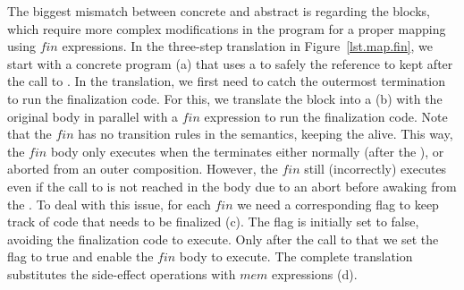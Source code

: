 The biggest mismatch between concrete and abstract \CEU is regarding the 
 blocks, which require more complex modifications in the program
for a proper mapping using $fin$ expressions.
In the three-step translation in Figure~\ref{lst.map.fin}, we start with a 
concrete program (a) that uses a  to safely  the 
reference to  kept after the call to .
In the translation, we first need to catch the outermost  
termination to run the finalization code.
For this, we translate the block into a  (b) with the original 
body in parallel with a $fin$ expression to run the finalization code.
Note that the $fin$ has no transition rules in the semantics, keeping the 
 alive.
This way, the $fin$ body only executes when the  terminates either 
normally (after the ), or aborted from an outer composition.
%
However, the $fin$ still (incorrectly) executes even if the call to 
 is not reached in the body due to an abort before awaking from 
the .
%
To deal with this issue, for each $fin$ we need a corresponding flag to keep 
track of code that needs to be finalized (c).
%
The flag is initially set to false, avoiding the finalization code to execute.
Only after the call to  that we set the flag to true and enable 
the $fin$ body to execute.
%
The complete translation substitutes the side-effect operations with $mem$ 
expressions (d).

